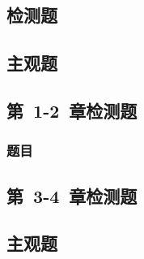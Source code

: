 \documentclass[color=orange]{textbook-cn}%
\begin{document}
\begin{Quiz}
\chapter{检测题}


\section{主观题}
\end{Quiz}






\begin{Test}
\chapter{第~1-2~章检测题}
\lipsum\lipsum\cite{7}\cite{6}
\subsection{题目}
\end{Test}

\begin{Quiz}
\chapter{第~3-4~章检测题}
\section{主观题}
\end{Quiz}



\tcbstoprecording
\end{document}
